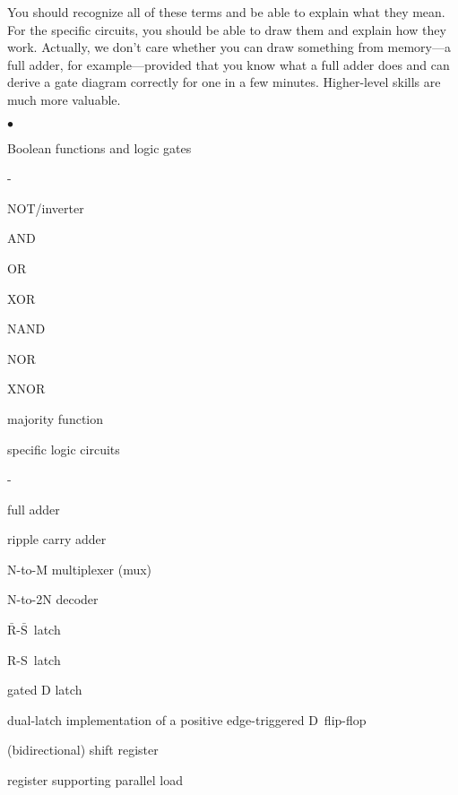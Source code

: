 \vfill

\pagebreak

You should recognize all of these terms
and be able to explain what they mean.  For the specific circuits, you 
should be able to draw them and explain how they work.
%
Actually, we don't care whether you can draw something from memory---a full
adder, for example---provided that you know what a full adder does and can
derive a gate diagram correctly for one in a few minutes.  Higher-level
skills are much more valuable.  

\begin{minipage}[t]{2.8in}
\begin{list}{$\bullet$}{\setlength{\itemsep}{0pt}\setlength{\parskip}{0pt}%
\setlength{\topsep}{0pt}\setlength{\partopsep}{0pt}\setlength{\parsep}{0pt}}

\item{Boolean functions and logic gates}
\begin{list}{-}{\setlength{\itemsep}{0pt}\setlength{\parskip}{0pt}%
\setlength{\topsep}{0pt}\setlength{\partopsep}{0pt}\setlength{\parsep}{0pt}}
\item{NOT/inverter}
\item{AND}
\item{OR}
\item{XOR}
\item{NAND}
\item{NOR}
\item{XNOR}
\item{majority function}
\end{list}

\item{specific logic circuits}
\begin{list}{-}{\setlength{\itemsep}{0pt}\setlength{\parskip}{0pt}%
\setlength{\topsep}{0pt}\setlength{\partopsep}{0pt}\setlength{\parsep}{0pt}}
\item{full adder}
\item{ripple carry adder}
\item N-to-M multiplexer (mux)
\item N-to-2N decoder
\item{\mbox{$\bar{\mbox{R}}$-$\bar{\mbox{S}}$~latch}}
\item{\mbox{R-S~latch}}
\item{gated D latch}
%
%
\item{dual-latch implementation of a positive edge-triggered D~flip-flop}
\item{(bidirectional) shift register}
\item{register supporting parallel load}
\end{list}


\end{list}
\end{minipage}
